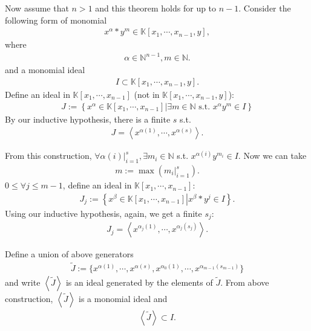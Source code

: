 \documentclass[11pt]{book}
\begin{document}
Now assume that $n>1$ and this theorem holds for up to $n-1$.
Consider the following form of monomial
\begin{eqnarray}
x^\alpha * y^m \in \mathbb{K}[x_1, \cdots, x_{n-1},y],
\end{eqnarray}
where
\begin{eqnarray}
\alpha \in \mathbb{N}^{n-1}, m \in \mathbb{N}.
\end{eqnarray}
and a monomial ideal
\begin{eqnarray}
I \subset \mathbb{K}[x_1, \cdots, x_{n-1},y].
\end{eqnarray}
Define an ideal in $\mathbb{K}[x_1, \cdots, x_{n-1}]$ (not in $\mathbb{K}[x_1, \cdots, x_{n-1}, y]$):
\begin{eqnarray}
J := \left\{ \left. x^\alpha \in \mathbb{K}[x_1, \cdots, x_{n-1}] \right| \exists m \in \mathbb{N} \text{ s.t. } x^\alpha y^m \in I \right\}
\end{eqnarray}
By our inductive hypothesis, there is a finite $s$ s.t.
\begin{eqnarray}
J = \left<x^{\alpha(1)}, \cdots, x^{\alpha(s)} \right>.
\end{eqnarray}

From this construction, $\forall \left. \alpha(i) \right|_{i=1}^s, \exists m_i \in \mathbb{N}$ s.t. $x^{\alpha(i)} y^{m_i} \in I$.
Now we can take 
\begin{eqnarray}
m := \max\left(\left. m_i \right|_{i=1}^s \right).
\end{eqnarray}
$0 \leq \forall j \leq m-1$, define an ideal in $\mathbb{K}[x_1, \cdots, x_{n-1}]$:
\begin{eqnarray}
J_j := \left\{ \left. x^\beta \in \mathbb{K}[x_1, \cdots, x_{n-1}] \right| x^\beta * y^j \in I \right\}.
\end{eqnarray}
Using our inductive hypothesis, again, we get a finite $s_j$:
\begin{eqnarray}
J_j =  \left<x^{\alpha_j(1)}, \cdots, x^{\alpha_j(s_j)} \right>.
\end{eqnarray}

Define a union of above generators
\begin{eqnarray}
\tilde{J} := \{ x^{\alpha(1)}, \cdots, x^{\alpha(s)}, x^{\alpha_0(1)}, \cdots, x^{\alpha_{m-1}(s_{m-1})}\} 
\end{eqnarray}
and write $\left< \tilde{J} \right>$ is an ideal generated by the elements of $\tilde{J}$.
From above construction, $\left< \tilde{J} \right>$ is a monomial ideal and
\begin{eqnarray}
\label{JJsubsetI}
\left< \tilde{J} \right> \subset I.
\end{eqnarray}
\end{document}
